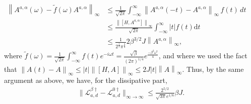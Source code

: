 \documentclass[aps,pra,amsmath,amssymb,twocolumn,10pt]{revtex4-2}
\theoremstyle{definition}
\newcommand{\norm}[1]{\left\|#1\right\|}
\begin{document}
\begin{align}
	\norm{A^{a,\alpha}(\omega)- \tilde{f}(\omega)A^{a,\alpha}}_\infty &\le \frac{1}{\sqrt{2\pi}}\int_{-\infty}^{\infty} \norm{A^{a,\alpha}(-t)-A^{a,\alpha} }_\infty \,f(t)\,dt\qquad 
	\\ & \le \frac{\norm{[H,A^{a,\alpha}]}_\infty}{\sqrt{2\pi}}\int_{-\infty}^{\infty}  \vert t \vert  f(t) \text{d}t
	\\ & \le \frac{1}{2^{\frac{1}{4}} \pi^{\frac{3}{4}}} 2 \beta^{3/2} J \norm{A^{a,\alpha}}_\infty,
\end{align}
where $\tilde{f}(\omega)= \frac{1}{\sqrt{2 \pi}} \int^{\infty}_{-\infty}f(t) e^{-i \omega t}=\frac{\sqrt{\beta}}{(2 \pi)^{1/4}} e^{\frac{-\beta^2 \omega^2}{4}}$, and
where we used the fact that $\norm{A(t)-A}_\infty\le \vert t \vert \norm{[H,A]}_\infty\le 2J\vert t \vert \norm{A}_\infty $. Thus, by the same argument as above, we have, for the dissipative part,
\begin{align}
	\|\mathcal{L}_{a,d}^{\beta \dagger}-\mathcal{L}_{a,d}^{0 \dagger }\|_{\infty\to\infty}\le \frac{2^{5/2}}{\sqrt{3 \pi}e^{1/6}} \beta J.
\end{align}
\end{document}
